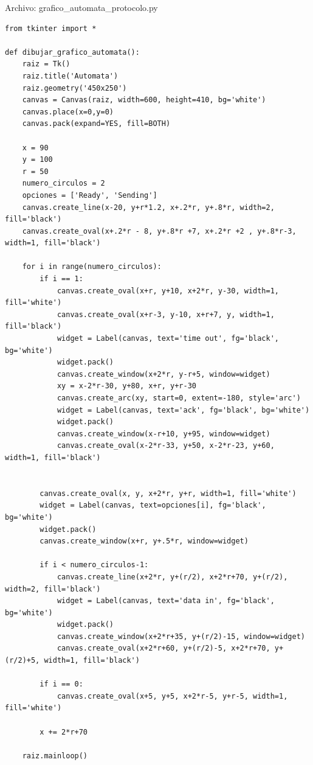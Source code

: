 \documentclass[12pt]{article}
\begin{document}
Archivo: grafico\_automata\_protocolo.py
\lstset{language=Python, breaklines=true, basicstyle=\footnotesize}
\begin{lstlisting}[frame=single]
from tkinter import *

def dibujar_grafico_automata():
    raiz = Tk()
    raiz.title('Automata')
    raiz.geometry('450x250')
    canvas = Canvas(raiz, width=600, height=410, bg='white')
    canvas.place(x=0,y=0)
    canvas.pack(expand=YES, fill=BOTH)

    x = 90
    y = 100
    r = 50
    numero_circulos = 2
    opciones = ['Ready', 'Sending']
    canvas.create_line(x-20, y+r*1.2, x+.2*r, y+.8*r, width=2, fill='black')
    canvas.create_oval(x+.2*r - 8, y+.8*r +7, x+.2*r +2 , y+.8*r-3, width=1, fill='black')

    for i in range(numero_circulos):
        if i == 1:
            canvas.create_oval(x+r, y+10, x+2*r, y-30, width=1, fill='white')
            canvas.create_oval(x+r-3, y-10, x+r+7, y, width=1, fill='black')
            widget = Label(canvas, text='time out', fg='black', bg='white')
            widget.pack()
            canvas.create_window(x+2*r, y-r+5, window=widget)
            xy = x-2*r-30, y+80, x+r, y+r-30
            canvas.create_arc(xy, start=0, extent=-180, style='arc')
            widget = Label(canvas, text='ack', fg='black', bg='white')
            widget.pack()
            canvas.create_window(x-r+10, y+95, window=widget)
            canvas.create_oval(x-2*r-33, y+50, x-2*r-23, y+60, width=1, fill='black')


        canvas.create_oval(x, y, x+2*r, y+r, width=1, fill='white')
        widget = Label(canvas, text=opciones[i], fg='black', bg='white')
        widget.pack()
        canvas.create_window(x+r, y+.5*r, window=widget)

        if i < numero_circulos-1:
            canvas.create_line(x+2*r, y+(r/2), x+2*r+70, y+(r/2), width=2, fill='black')
            widget = Label(canvas, text='data in', fg='black', bg='white')
            widget.pack()
            canvas.create_window(x+2*r+35, y+(r/2)-15, window=widget)
            canvas.create_oval(x+2*r+60, y+(r/2)-5, x+2*r+70, y+(r/2)+5, width=1, fill='black')

        if i == 0:
            canvas.create_oval(x+5, y+5, x+2*r-5, y+r-5, width=1, fill='white')

        x += 2*r+70

    raiz.mainloop()

\end{lstlisting}
\end{document}
